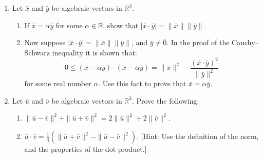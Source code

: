 \begin{exercisebox}
\begin{enumerate}[label=\arabic*., series=exercises]
\end{enumerate}
\end{exercisebox}

\newpage

\begin{exercisebox}
\begin{enumerate}[label=\arabic*., resume=exercises]
    
\item Let $\bar{x}$ and $\bar{y}$ be algebraic vectors in $\mathbb{R}^3$.
\begin{enumerate}[label=(\alph*)]
\item If $\bar{x} = \alpha \bar{y}$ for some $\alpha \in \mathbb{R}$, show that $|\bar{x} \cdot \bar{y}| = \|\bar{x}\|\|\bar{y}\|$.
\item Now suppose $|\bar{x} \cdot \bar{y}| = \|\bar{x}\|\|\bar{y}\|$, and $\bar{y} \ne \bar{0}$. In the proof of the Cauchy–Schwarz inequality it is shown that:
\[
0 \le (\bar{x} - \alpha \bar{y}) \cdot (\bar{x} - \alpha \bar{y}) = \|\bar{x}\|^2 - \frac{(\bar{x} \cdot \bar{y})^2}{\|\bar{y}\|^2}
\]
for some real number $\alpha$. Use this fact to prove that $\bar{x} = \alpha \bar{y}$.
\end{enumerate}

\item Let $\bar{u}$ and $\bar{v}$ be algebraic vectors in $\mathbb{R}^3$. Prove the following:
\begin{enumerate}[label=(\alph*)]
\item $\|\bar{u} - \bar{v}\|^2 + \|\bar{u} + \bar{v}\|^2 = 2\|\bar{u}\|^2 + 2\|\bar{v}\|^2$.
\item $\bar{u} \cdot \bar{v} = \frac{1}{4} \left( \|\bar{u} + \bar{v}\|^2 - \|\bar{u} - \bar{v}\|^2 \right)$.
[Hint: Use the definition of the norm, and the properties of the dot product.]
\end{enumerate}
\end{enumerate}
\end{exercisebox}

